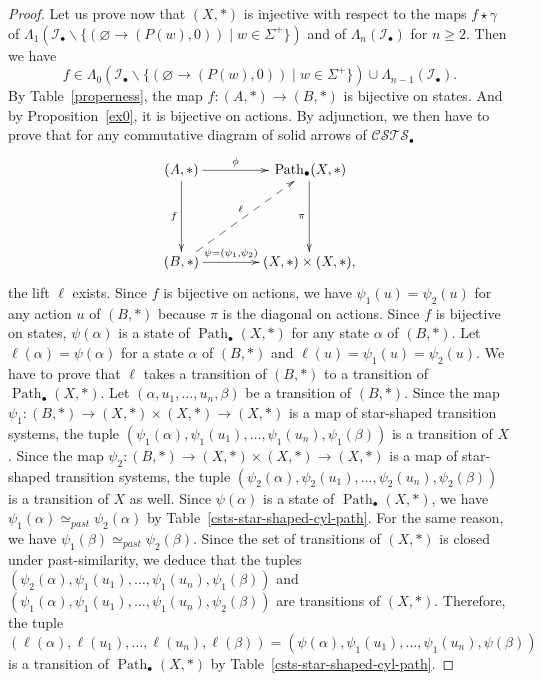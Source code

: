 \documentclass[a4paper,12pt]{amsart}
\begin{document}
\begin{proof}
Let us prove now that $(X,*)$ is injective with respect to the maps
$f\star \gamma$ of $\Lambda_1({\mathcal{I}}_\bullet\backslash \{(\varnothing \to
(P(w),0)) \mid w\in \Sigma^+\})$ and of $\Lambda_n({\mathcal{I}}_\bullet)$ for
$n{\geqslant} 2$. Then we have \[f\in \Lambda_0({\mathcal{I}}_\bullet\backslash
\{(\varnothing \to (P(w),0)) \mid w\in \Sigma^+\}) \cup
\Lambda_{n-1}({\mathcal{I}}_\bullet).\] By Table~\ref{properness}, the map
$f:(A,*)\to (B,*)$ is bijective on states.  And by
Proposition~\ref{ex0}, it is bijective on actions. By adjunction, we
then have to prove that for any commutative diagram of solid arrows of
${\mathcal{C\!S\!T\!S}}_\bullet$
\[
\xymatrix@C=4em@R=5em
{
(A,*) {\ar@{->}[r]^-{{\phi}}} {\ar@{->}[d]_-{{f}}} & {\ar@{->}[d]_-{{\pi}}} \operatorname{{Path}}_\bullet(X,*) \\
(B,*) \ar@{-->}[ru]^-{\ell} {\ar@{->}[r]^-{{\psi=(\psi_1,\psi_2)}}} & (X,*)\times (X,*),
}
\]
the lift $\ell$ exists. Since $f$ is bijective on actions, we have
$\psi_1(u)=\psi_2(u)$ for any action $u$ of $(B,*)$ because $\pi$ is
the diagonal on actions. Since $f$ is bijective on states,
$\psi(\alpha)$ is a state of $\operatorname{{Path}}_\bullet(X,*)$ for any state
$\alpha$ of $(B,*)$. Let $\ell(\alpha)=\psi(\alpha)$ for a state
$\alpha$ of $(B,*)$ and $\ell(u)=\psi_1(u)=\psi_2(u)$. We have to
prove that $\ell$ takes a transition of $(B,*)$ to a transition of
$\operatorname{{Path}}_\bullet(X,*)$. Let $(\alpha,u_1,\dots,u_n,\beta)$ be a
transition of $(B,*)$. Since the map $\psi_1:(B,*)\to (X,*)\times (X,*)
\to (X,*)$ is a map of star-shaped transition systems, the tuple
$(\psi_1(\alpha),\psi_1(u_1),\dots,\psi_1(u_n),\psi_1(\beta))$ is a
transition of $X$. Since the map $\psi_2:(B,*)\to (X,*)\times (X,*) \to
(X,*)$ is a map of star-shaped transition systems, the tuple
$(\psi_2(\alpha),\psi_2(u_1),\dots,\psi_2(u_n),\psi_2(\beta))$ is a
transition of $X$ as well.  Since $\psi(\alpha)$ is a state of
$\operatorname{{Path}}_\bullet(X,*)$, we have $\psi_1(\alpha)\simeq_{past}
\psi_2(\alpha)$ by Table~\ref{csts-star-shaped-cyl-path}. For the same
reason, we have $\psi_1(\beta)\simeq_{past} \psi_2(\beta)$.  Since the
set of transitions of $(X,*)$ is closed under past-similarity, we
deduce that the tuples
$(\psi_2(\alpha),\psi_1(u_1),\dots,\psi_1(u_n),\psi_1(\beta))$ and
$(\psi_1(\alpha),\psi_1(u_1),\dots,\psi_1(u_n),\psi_2(\beta))$ are
transitions of $(X,*)$. Therefore, the tuple
\[(\ell(\alpha),\ell(u_1),\dots,\ell(u_n),\ell(\beta)) =
(\psi(\alpha),\psi_1(u_1),\dots,\psi_1(u_n),\psi(\beta))\] is a
transition of $\operatorname{{Path}}_\bullet(X,*)$ by
Table~\ref{csts-star-shaped-cyl-path}.


\end{proof}
\end{document}
